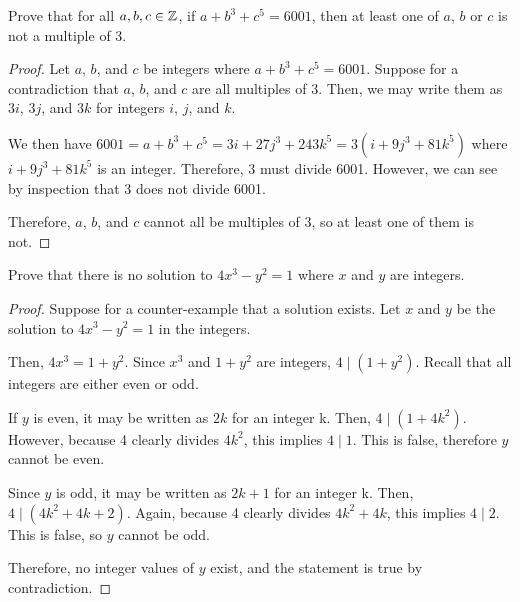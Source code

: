 \documentclass{agony}
\begin{document}
\question Prove that for all $a, b, c \in \mathbb{Z}$, if $a + b^3 + c^5 = 6001$,
then at least one of $a$, $b$ or $c$ is not a multiple of 3.
\begin{proof}
  Let $a$, $b$, and $c$ be integers where $a + b^3 + c^5 = 6001$.
  Suppose for a contradiction that $a$, $b$, and $c$ are all multiples of 3.
  Then, we may write them as $3i$, $3j$, and $3k$ for integers $i$, $j$, and $k$.

  We then have $6001 = a+b^3+c^5 = 3i+27j^3+243k^5 = 3(i+9j^3+81k^5)$
  where $i+9j^3+81k^5$ is an integer.
  Therefore, 3 must divide 6001.
  However, we can see by inspection that 3 does not divide 6001.

  Therefore, $a$, $b$, and $c$ cannot all be multiples of 3, so at least one of them is not.
\end{proof}


\question Prove that there is no solution to $4x^3 - y^2 = 1$ where $x$ and $y$ are integers.
\begin{proof}


  Suppose for a counter-example that a solution exists.
  Let $x$ and $y$ be the solution to $4x^3-y^2=1$ in the integers.

  Then, $4x^3 = 1+y^2$.
  Since $x^3$ and $1+y^2$ are integers, $4 \mid (1+y^2)$.
  Recall that all integers are either even or odd.

  If $y$ is even, it may be written as $2k$ for an integer k.
  Then, $4 \mid (1+4k^2)$.
  However, because 4 clearly divides $4k^2$, this implies $4 \mid 1$.
  This is false, therefore $y$ cannot be even.

  Since $y$ is odd, it may be written as $2k+1$ for an integer k.
  Then, $4 \mid (4k^2+4k+2)$.
  Again, because 4 clearly divides $4k^2+4k$, this implies $4 \mid 2$.
  This is false, so $y$ cannot be odd.

  Therefore, no integer values of $y$ exist, and the statement is true by contradiction.
\end{proof}
\end{document}
